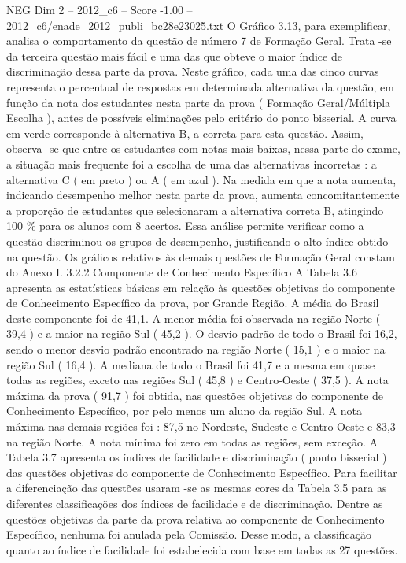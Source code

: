 \begin{textsample}{NEG Dim 2 – 2012\_c6 – Score -1.00 – 2012\_c6/enade\_2012\_publi\_bc28e23025.txt}
O Gráfico 3.13, para exemplificar, analisa o comportamento da questão de número 7 de Formação Geral.
Trata -se da terceira questão mais fácil e uma das que obteve o maior índice de discriminação dessa parte da prova.
Neste gráfico, cada uma das cinco curvas representa o percentual de respostas em determinada alternativa da questão, em função da nota dos estudantes nesta parte da prova ( Formação Geral/Múltipla Escolha ), antes de possíveis eliminações pelo critério do ponto bisserial.
A curva em verde corresponde à alternativa B, a correta para esta questão.
Assim, observa -se que entre os estudantes com notas mais baixas, nessa parte do exame, a situação mais frequente foi a escolha de uma das alternativas incorretas : a alternativa C ( em preto ) ou A ( em azul ).
Na medida em que a nota aumenta, indicando desempenho melhor nesta parte da prova, aumenta concomitantemente a proporção de estudantes que selecionaram a alternativa correta B, atingindo 100 \% para os alunos com 8 acertos.
Essa análise permite verificar como a questão discriminou os grupos de desempenho, justificando o alto índice obtido na questão.
Os gráficos relativos às demais questões de Formação Geral constam do Anexo I. 3.2.2 Componente de Conhecimento Específico A Tabela 3.6 apresenta as estatísticas básicas em relação às questões objetivas do componente de Conhecimento Específico da prova, por Grande Região.
A média do Brasil deste componente foi de 41,1.
A menor média foi observada na região Norte ( 39,4 ) e a maior na região Sul ( 45,2 ).
O desvio padrão de todo o Brasil foi 16,2, sendo o menor desvio padrão encontrado na região Norte ( 15,1 ) e o maior na região Sul ( 16,4 ).
A mediana de todo o Brasil foi 41,7 e a mesma em quase todas as regiões, exceto nas regiões Sul ( 45,8 ) e Centro-Oeste ( 37,5 ).
A nota máxima da prova ( 91,7 ) foi obtida, nas questões objetivas do componente de Conhecimento Específico, por pelo menos um aluno da região Sul.
A nota máxima nas demais regiões foi : 87,5 no Nordeste, Sudeste e Centro-Oeste e 83,3 na região Norte.
A nota mínima foi zero em todas as regiões, sem exceção.
A Tabela 3.7 apresenta os índices de facilidade e discriminação ( ponto bisserial ) das questões objetivas do componente de Conhecimento Específico.
Para facilitar a diferenciação das questões usaram -se as mesmas cores da Tabela 3.5 para as diferentes classificações dos índices de facilidade e de discriminação.
Dentre as questões objetivas da parte da prova relativa ao componente de Conhecimento Específico, nenhuma foi anulada pela Comissão.
Desse modo, a classificação quanto ao índice de facilidade foi estabelecida com base em todas as 27 questões.

\end{textsample}
